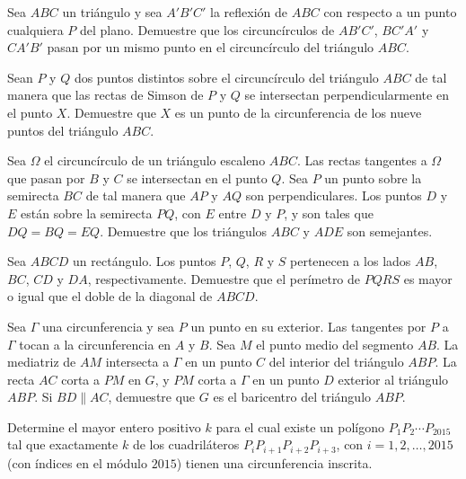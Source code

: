 \begin{probEG}
	Sea $ABC$ un triángulo y sea $A'B'C'$ la reflexión de $ABC$ con respecto a un punto cualquiera $P$ del plano. Demuestre que los circuncírculos de $AB'C'$, $BC'A'$ y $CA'B'$ pasan por un mismo punto en el circuncírculo del triángulo $ABC$.
\end{probEG}

\begin{probEG}
	Sean $P$ y $Q$ dos puntos distintos sobre el circuncírculo del triángulo $ABC$ de tal manera que las rectas de Simson de $P$ y $Q$ se intersectan perpendicularmente en el punto $X$. Demuestre que $X$ es un punto de la circunferencia de los nueve puntos del triángulo $ABC$.
\end{probEG}

\begin{probEG}
	Sea $\Omega$ el circuncírculo de un triángulo escaleno $ABC$. Las rectas tangentes a $\Omega$ que pasan por $B$ y $C$ se intersectan en el punto $Q$. Sea $P$ un punto sobre la semirecta $BC$ de tal manera que $AP$ y $AQ$ son perpendiculares. Los puntos $D$ y $E$ están sobre la semirecta $PQ$, con $E$ entre $D$ y $P$, y son tales que $DQ=BQ=EQ$. Demuestre que los triángulos $ABC$ y $ADE$ son semejantes.
\end{probEG}

\begin{probEG}
	Sea $ABCD$ un rectángulo. Los puntos $P$, $Q$, $R$ y $S$ pertenecen a los lados $AB$, $BC$, $CD$ y $DA$, respectivamente. Demuestre que el perímetro de $PQRS$ es mayor o igual que el doble de la diagonal de $ABCD$.
\end{probEG}

\begin{probEG}
	Sea $\Gamma$ una circunferencia y sea $P$ un punto en su exterior. Las tangentes por $P$ a $\Gamma$ tocan a la circunferencia en $A$ y $B$. Sea $M$ el punto medio del segmento $AB$. La mediatriz de $AM$ intersecta a $\Gamma$ en un punto $C$ del interior del triángulo $ABP$. La recta $AC$ corta a $PM$ en $G$, y $PM$ corta a $\Gamma$ en un punto $D$ exterior al triángulo $ABP$. Si $BD\parallel AC$, demuestre que $G$ es el baricentro del triángulo $ABP$.
\end{probEG}

\begin{probEG}
	Determine el mayor entero positivo $k$ para el cual existe un polígono $P_1P_2\cdots P_{2015}$ tal que exactamente $k$ de los cuadriláteros $P_iP_{i+1}P_{i+2}P_{i+3}$, con $i=1,2,\dots,2015$ (con índices en el módulo $2015$) tienen una circunferencia inscrita.
\end{probEG}

